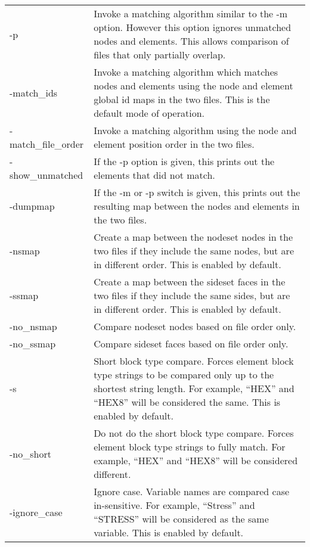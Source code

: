 \begin{longtable}{lp{4.0in}}
-p & Invoke a matching algorithm similar to the -m option.  However 
	this option ignores unmatched nodes and elements.  This allows 
	comparison of files that only partially overlap. \\

-match\_ids & Invoke a matching algorithm which matches nodes and elements using the node and element
        global id maps in the two files. This is the default
        mode of operation.\\

-match\_file\_order & Invoke a matching algorithm using the node and element
        position order in the two files. \\

-show\_unmatched & If the -p option is given, this prints out the 
        elements that did not match. \\

-dumpmap & If the -m or -p switch is given, this prints out the resulting
        map between the nodes and elements in the two files. \\

-nsmap & Create a map between the nodeset nodes in the two files
        if they include the same nodes, but are in different
        order. This is enabled by default.\\

-ssmap & Create a map between the sideset faces in the two files
        if they include the same sides, but are in different order.
        This is enabled by default.\\

-no\_nsmap & Compare nodeset nodes based on file order only. \\
-no\_ssmap & Compare sideset faces based on file order only. \\

-s & Short block type compare.  Forces element block type strings to
        be compared only up to the shortest string length.  For example,
        ``HEX'' and ``HEX8'' will be considered the same. This is enabled by default. \\

-no\_short & Do not do the short block type compare.  Forces element block
        type strings to fully match. For example, ``HEX'' and ``HEX8''
        will be considered different. \\

 -ignore\_case & Ignore case.  Variable names are compared case
	in-sensitive.  For example, ``Stress'' and ``STRESS'' will be
	considered as the same variable. This is enabled by default. \\


\end{longtable}
